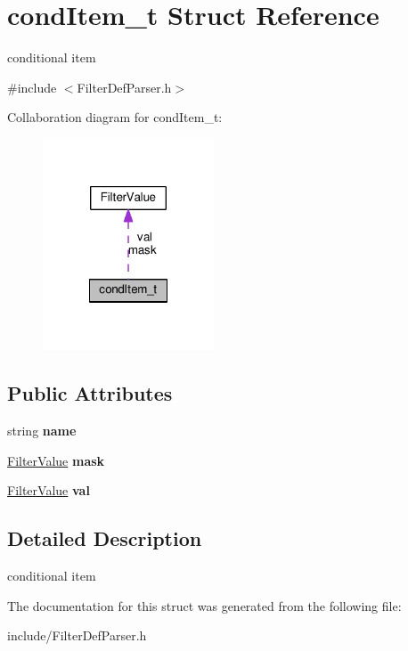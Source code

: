 \hypertarget{structcondItem__t}{}\section{cond\+Item\+\_\+t Struct Reference}
\label{structcondItem__t}


conditional item  




{\ttfamily \#include $<$Filter\+Def\+Parser.\+h$>$}



Collaboration diagram for cond\+Item\+\_\+t\+:
\nopagebreak
\begin{figure}[H]
\begin{center}
\leavevmode
\includegraphics[width=144pt]{structcondItem__t__coll__graph}
\end{center}
\end{figure}
\subsection*{Public Attributes}
\begin{DoxyCompactItemize}
\item 
\mbox{\label{structcondItem__t_a22c02ebadfc28c0a00540462cd975371}} 
string {\bfseries name}
\item 
\mbox{\label{structcondItem__t_ab3c9ea5bf5fb5ae0638bc3fdacdbf5d7}} 
\hyperlink{classFilterValue}{Filter\+Value} {\bfseries mask}
\item 
\mbox{\label{structcondItem__t_a164a56089a136e81be945af1f6a8f6e0}} 
\hyperlink{classFilterValue}{Filter\+Value} {\bfseries val}
\end{DoxyCompactItemize}


\subsection{Detailed Description}
conditional item 

The documentation for this struct was generated from the following file\+:\begin{DoxyCompactItemize}
\item 
include/Filter\+Def\+Parser.\+h\end{DoxyCompactItemize}
